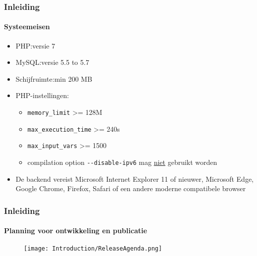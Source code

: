 \begin{frame}[fragile]
	\frametitle{Inleiding}
	\framesubtitle{Systeemeisen}

	\begin{itemize}
		\item PHP:\tabto{2.2cm}versie 7
		\item MySQL:\tabto{2.2cm}versie 5.5 to 5.7
		\item Schijfruimte:\tabto{2.2cm}min 200 MB
		\item PHP-instellingen:

			\begin{itemize}
				\item \texttt{memory\_limit} >= 128M
				\item \texttt{max\_execution\_time} >= 240s
				\item \texttt{max\_input\_vars} >= 1500
				\item compilation option \texttt{-}\texttt{-disable-ipv6} mag \underline{niet} gebruikt worden
			\end{itemize}

		\item De backend vereist Microsoft Internet Explorer 11 of nieuwer,
			Microsoft Edge, Google Chrome, Firefox, Safari of een andere moderne
			compatibele browser

	\end{itemize}

\end{frame}

\begin{frame}[fragile]
	\frametitle{Inleiding}
	\framesubtitle{Planning voor ontwikkeling en publicatie}

	\begin{figure}
		\texttt{[image: Introduction/ReleaseAgenda.png]}
	\end{figure}

\end{frame}


